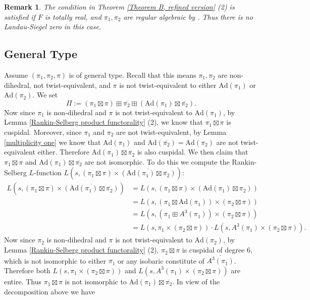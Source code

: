 \documentclass[12pt]{amsart}
\newcommand{\Ad}{\text{Ad}}
\newcommand{\ov}{\overline}
\newtheorem{remark}{Remark}[section]
\begin{document}
\begin{remark}
    The condition in Theorem \ref{Theorem B, refined version} (2) is satisfied if $F$ is totally real, and $\pi_1,\pi_2$ are regular algebraic by \cite[Lemma 4.2]{Thorner2025}. Thus there is no Landau-Siegel zero in this case.
\end{remark}

\subsection{General Type}
Assume $(\pi_1,\pi_2,\pi)$ is of general type. Recall that this means $\pi_1,\pi_2$ are non-dihedral, not twist-equivalent, and $\pi$ is not twist-equivalent to either $\Ad(\pi_1)$ or $\Ad(\pi_2)$. We set 
$$\Pi := (\pi_1 \boxtimes \pi) \boxplus \ov{\pi_2} \boxplus (\Ad(\pi_1) \boxtimes \ov{\pi_2}).$$
Now since $\pi_1$ is non-dihedral and $\pi$ is not twist-equivalent to $\Ad(\pi_1)$, by Lemma \ref{Rankin-Selberg product functorality} (2), we know that $\pi_1 \boxtimes \pi$ is cuspidal. Moreover, since $\pi_1$ and $\pi_2$ are not twist-equivalent, by Lemma \ref{multiplicity one} we know that $\Ad(\pi_1)$ and $\Ad(\ov{\pi_2}) = \Ad(\pi_2)$ are not twist-equivalent either. Therefore $\Ad(\pi_1) \boxtimes \ov{\pi_2}$ is also cuspidal. We then claim that $\pi_1 \boxtimes \pi$ and $\Ad(\pi_1) \boxtimes \ov{\pi_2}$ are not isomorphic. To do this we compute the Rankin-Selberg $L$-function $L(s,(\pi_1 \boxtimes \pi) \times \ov{(\Ad(\pi_1) \boxtimes \ov{\pi_2})})$:
\begin{align*}
    L(s,(\pi_1 \boxtimes \pi) \times \ov{(\Ad(\pi_1) \boxtimes \ov{\pi_2})})&= L(s,(\pi_1 \boxtimes \pi) \times (\Ad(\pi_1) \boxtimes \pi_2)) \\
    &= L(s,(\pi_1 \boxtimes \Ad(\pi_1)) \times (\pi_2 \boxtimes \pi)) \\
    &= L(s,(\pi_1 \boxplus A^3(\pi_1)) \times (\pi_2 \boxtimes \pi)) \\
    &= L(s,\pi_1 \times (\pi_2 \boxtimes\pi)) \cdot L(s,A^3(\pi_1) \times (\pi_2 \boxtimes \pi)).
\end{align*}
Now since $\pi_2$ is non-dihedral and $\pi$ is not twist-equivalent to $\Ad(\pi_2)$, by Lemma \ref{Rankin-Selberg product functorality} (2), $\pi_2 \boxtimes \pi$ is cuspidal of degree $6$, which is not isomorphic to either $\ov{\pi_1}$ or any isobaric constitute of $\ov{A^3(\pi_1)}$. Therefore both $L(s,\pi_1 \times (\pi_2 \boxtimes \pi))$ and $L(s,A^3(\pi_1) \times (\pi_2 \boxtimes \pi))$ are entire. Thus $\pi_1 \boxtimes \pi$ is not isomorphic to $\Ad(\pi_1) \boxtimes \ov{\pi_2}$. In view of the decomposition above we have
\end{document}
